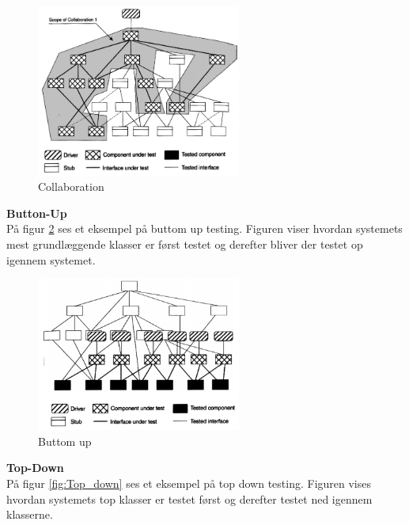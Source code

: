 \vspace{-5pt}
\begin{figure}[H]
	\centering
	\includegraphics[width=0.6\textwidth]{Billeder/Test/collaboration.png}
	\vspace{-5pt}
	\caption{Collaboration}
	\label{fig:Collaboration}
\end{figure}


\textbf{Button-Up}\\
På figur \ref{fig:Buttom_up} ses et eksempel på buttom up testing. Figuren viser hvordan systemets mest grundlæggende klasser er først testet og derefter bliver der testet op igennem systemet. 

\begin{figure}[H]
	\centering
	\includegraphics[width=0.6\textwidth]{Billeder/Test/buttom-up.png}
	\vspace{-5pt}
	\caption{Buttom up}
	\label{fig:Buttom_up}
\end{figure}

\newpage

\textbf{Top-Down}\\
På figur \ref{fig:Top_down} ses et eksempel på top down testing. Figuren vises hvordan systemets top klasser er testet først og derefter testet ned igennem klasserne.

